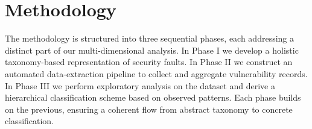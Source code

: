 \section{Methodology} The methodology is structured into three sequential phases, each addressing a distinct part of our multi-dimensional analysis. In Phase I we develop a holistic taxonomy-based representation of security faults. In Phase II we construct an automated data-extraction pipeline to collect and aggregate vulnerability records. In Phase III we perform exploratory analysis on the dataset and derive a hierarchical classification scheme based on observed patterns. Each phase builds on the previous, ensuring a coherent flow from abstract taxonomy to concrete classification.




